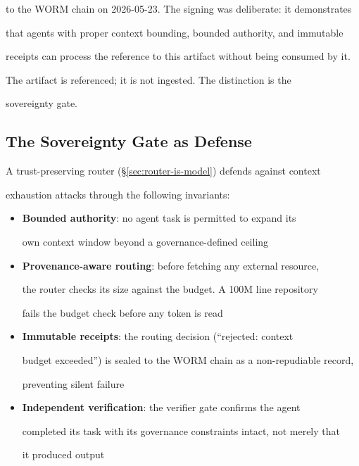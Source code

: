 to the WORM chain on 2026-05-23. The signing was deliberate: it demonstrates

that agents with proper context bounding, bounded authority, and immutable

receipts can process the reference to this artifact without being consumed by it.

The artifact is referenced; it is not ingested. The distinction is the

sovereignty gate.



\subsection{The Sovereignty Gate as Defense}



A trust-preserving router (\S\ref{sec:router-is-model}) defends against context

exhaustion attacks through the following invariants:



\begin{itemize}

  \item \textbf{Bounded authority}: no agent task is permitted to expand its

    own context window beyond a governance-defined ceiling

  \item \textbf{Provenance-aware routing}: before fetching any external resource,

    the router checks its size against the budget. A 100M line repository

    fails the budget check before any token is read

  \item \textbf{Immutable receipts}: the routing decision (``rejected: context

    budget exceeded'') is sealed to the WORM chain as a non-repudiable record,

    preventing silent failure

  \item \textbf{Independent verification}: the verifier gate confirms the agent

    completed its task with its governance constraints intact, not merely that

    it produced output

\end{itemize}



